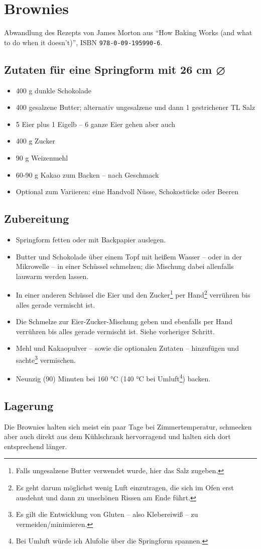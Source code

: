 \documentclass[version=last,paper=A4,DIV=15]{scrartcl}
\begin{document}
\thispagestyle{empty}

\section*{Brownies}

Abwandlung des Rezepts von James Morton aus \enquote{How Baking Works (and what to do when it doesn't)}, ISBN \texttt{978-0-09-195990-6}.

\subsection*{Zutaten für eine Springform mit 26 cm ⌀}

\begin{itemize}
    \item 400 g dunkle Schokolade
    \item 400 gesalzene Butter; alternativ ungesalzene und dann 1 gestrichener TL Salz
    \item 5 Eier plus 1 Eigelb -- 6 ganze Eier gehen aber auch
    \item 400 g Zucker
    \item 90 g Weizenmehl
    \item 60-90 g Kakao zum Backen -- nach Geschmack
    \item Optional zum Variieren: eine Handvoll Nüsse, Schokostücke oder Beeren
\end{itemize}

\subsection*{Zubereitung}

\begin{itemize}
    \item Springform fetten oder mit Backpapier auslegen.
    \item Butter und Schokolade über einem Topf mit heißem Wasser -- oder in der Mikrowelle -- in einer Schüssel schmelzen; die Mischung dabei allenfalls lauwarm werden lassen.
    \item In einer anderen Schüssel die Eier und den Zucker\footnote{Falls ungesalzene Butter verwendet wurde, hier das Salz zugeben.} per Hand\footnote{Es geht darum möglichst wenig Luft einzutragen, die sich im Ofen erst ausdehnt und dann zu unschönen Rissen am Ende führt.} verrühren bis alles gerade vermischt ist.
    \item Die Schmelze zur Eier-Zucker-Mischung geben und ebenfalls per Hand verrühren bis alles gerade vermischt ist. Siehe vorheriger Schritt.
    \item Mehl und Kakaopulver -- sowie die optionalen Zutaten -- hinzufügen und sachte\footnote{Es gilt die Entwicklung von Gluten -- also Klebereiwiß -- zu vermeiden/minimieren.} vermischen.
    \item Neunzig (90) Minuten bei 160 °C (140 °C bei Umluft\footnote{Bei Umluft würde ich Alufolie über die Springform spannen.}) backen.
\end{itemize}

\subsection*{Lagerung}

Die Brownies halten sich meist ein paar Tage bei Zimmertemperatur, schmecken aber auch direkt aus dem Kühlschrank hervorragend und halten sich dort entsprechend länger.
\end{document}
